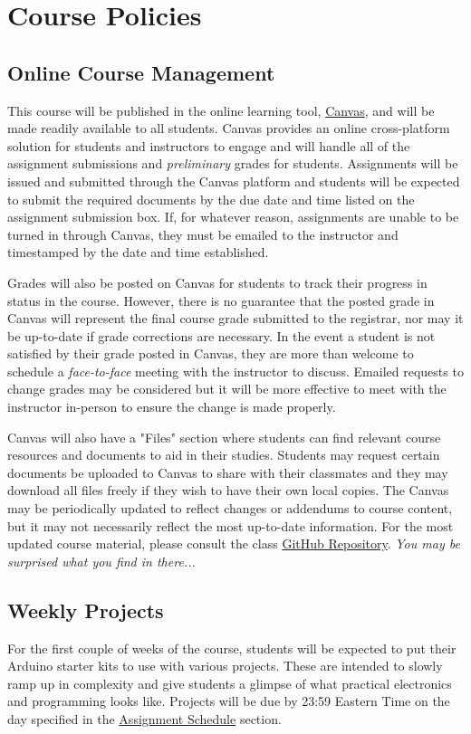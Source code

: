 \section*{Course Policies} 
    \subsection*{Online Course Management}
    This course will be published in the online learning tool, \href{instructure.fit.edu}{Canvas}, and will be made readily available to all students. 
    Canvas provides an online cross-platform solution for students and instructors to engage and will handle all of the assignment submissions and \emph{preliminary} grades for students.
    Assignments will be issued and submitted through the Canvas platform and students will be expected to submit the required documents by the due date and time listed on the assignment submission box.
    If, for whatever reason, assignments are unable to be turned in through Canvas, they must be emailed to the instructor and timestamped by the date and time established.
    
    Grades will also be posted on Canvas for students to track their progress in status in the course.
    However, there is no guarantee that the posted grade in Canvas will represent the final course grade submitted to the registrar, nor may it be up-to-date if grade corrections are necessary.
    In the event a student is not satisfied by their grade posted in Canvas, they are more than welcome to schedule a \emph{face-to-face} meeting with the instructor to discuss.
    Emailed requests to change grades may be considered but it will be more effective to meet with the instructor in-person to ensure the change is made properly.

    Canvas will also have a "Files" section where students can find relevant course resources and documents to aid in their studies.
    Students may request certain documents be uploaded to Canvas to share with their classmates and they may download all files freely if they wish to have their own local copies.
    The Canvas may be periodically updated to reflect changes or addendums to course content, but it may not necessarily reflect the most up-to-date information.
    For the most updated course material, please consult the class \href{https://github.com/OCE4531-Materials}{GitHub Repository}. \emph{You may be surprised what you find in there...}

    \subsection*{Weekly Projects}
    For the first couple of weeks of the course, students will be expected to put their Arduino starter kits to use with various projects.
    These are intended to slowly ramp up in complexity and give students a glimpse of what practical electronics and programming looks like.
    Projects will be due by 23:59 Eastern Time on the day specified in the \hyperref[sec:assignment_sch]{Assignment Schedule} section.
    
